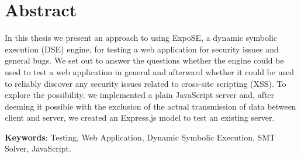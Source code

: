 \chapter*{Abstract}

In this thesis we present an approach to using ExpoSE, a dynamic symbolic execution (DSE) engine, for testing a web application for security issues and general bugs. We set out to answer the questions whether the engine could be used to test a web application in general and afterward whether it could be used to reliably discover any security issues related to cross-site scripting (XSS).
To explore the possibility, we implemented a plain JavaScript server and, after deeming it possible with the exclusion of the actual transmission of data between client and server, we created an Express.js model to test an existing server.



\textbf{Keywords}: Testing, Web Application, Dynamic Symbolic Execution, SMT Solver, JavaScript.
